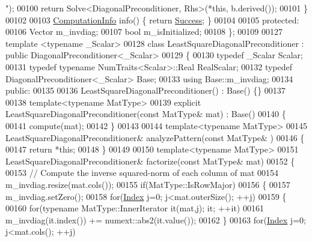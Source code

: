 \begin{DoxyCode}
{      "});
00100       \textcolor{keywordflow}{return} Solve<DiagonalPreconditioner, Rhs>(*\textcolor{keyword}{this}, b.derived());
00101     \}
00102     
00103     \hyperlink{group__enums_ga85fad7b87587764e5cf6b513a9e0ee5e}{ComputationInfo} info() \{ \textcolor{keywordflow}{return} \hyperlink{group__enums_gga85fad7b87587764e5cf6b513a9e0ee5ea52581b035f4b59c203b8ff999ef5fcea}{Success}; \}
00104 
00105   \textcolor{keyword}{protected}:
00106     Vector m\_invdiag;
00107     \textcolor{keywordtype}{bool} m\_isInitialized;
00108 \};
00109 
00127 \textcolor{keyword}{template} <\textcolor{keyword}{typename} \_Scalar>
00128 \textcolor{keyword}{class }LeastSquareDiagonalPreconditioner : \textcolor{keyword}{public} DiagonalPreconditioner<\_Scalar>
00129 \{
00130     \textcolor{keyword}{typedef} \_Scalar Scalar;
00131     \textcolor{keyword}{typedef} \textcolor{keyword}{typename} NumTraits<Scalar>::Real RealScalar;
00132     \textcolor{keyword}{typedef} DiagonalPreconditioner<\_Scalar> Base;
00133     \textcolor{keyword}{using} Base::m\_invdiag;
00134   \textcolor{keyword}{public}:
00135 
00136     LeastSquareDiagonalPreconditioner() : Base() \{\}
00137 
00138     \textcolor{keyword}{template}<\textcolor{keyword}{typename} MatType>
00139     \textcolor{keyword}{explicit} LeastSquareDiagonalPreconditioner(\textcolor{keyword}{const} MatType& mat) : Base()
00140     \{
00141       compute(mat);
00142     \}
00143 
00144     \textcolor{keyword}{template}<\textcolor{keyword}{typename} MatType>
00145     LeastSquareDiagonalPreconditioner& analyzePattern(\textcolor{keyword}{const} MatType& )
00146     \{
00147       \textcolor{keywordflow}{return} *\textcolor{keyword}{this};
00148     \}
00149     
00150     \textcolor{keyword}{template}<\textcolor{keyword}{typename} MatType>
00151     LeastSquareDiagonalPreconditioner& factorize(\textcolor{keyword}{const} MatType& mat)
00152     \{
00153       \textcolor{comment}{// Compute the inverse squared-norm of each column of mat}
00154       m\_invdiag.resize(mat.cols());
00155       \textcolor{keywordflow}{if}(MatType::IsRowMajor)
00156       \{
00157         m\_invdiag.setZero();
00158         \textcolor{keywordflow}{for}(\hyperlink{namespace_eigen_a62e77e0933482dafde8fe197d9a2cfde}{Index} j=0; j<mat.outerSize(); ++j)
00159         \{
00160           \textcolor{keywordflow}{for}(\textcolor{keyword}{typename} MatType::InnerIterator it(mat,j); it; ++it)
00161             m\_invdiag(it.index()) += numext::abs2(it.value());
00162         \}
00163         \textcolor{keywordflow}{for}(\hyperlink{namespace_eigen_a62e77e0933482dafde8fe197d9a2cfde}{Index} j=0; j<mat.cols(); ++j)

\end{DoxyCode}
